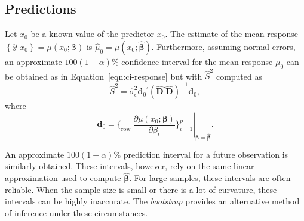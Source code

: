 \documentclass[cmfont,usenames,dvipsnames,leqno]{afit-etd}\usepackage[]{graphicx}\usepackage[]{color}
\newcommand{\trans}{\ensuremath{^\prime}}
\newcommand{\mc}[1]{\ensuremath{\mathcal{#1}}}
\newcommand{\wh}[1]{\ensuremath{\widehat{#1}}}
\begin{document}
\subsection{Predictions}
Let $x_0$ be a known value of the predictor $x_0$. The estimate of the mean response $\left\{\mc{Y} | x_0\right\} = \mu(x_0; \bm{\beta})$ is $\wh{\mu}_0 = \mu(x_0; \wh{\bm{\beta}})$. Furthermore, assuming normal errors, an approximate $100(1 - \alpha)\%$ confidence interval for the mean response $\mu_0$ can be obtained as in Equation~\eqref{eqn:ci-response} but with $\widehat{S}^2$ computed as 
\begin{equation*}
  \widehat{S}^2 = \wh{\sigma}_\epsilon^2 \bm{d}_0\trans\left(\widehat{\bm{D}}\trans\widehat{\bm{D}}\right)^{-1}\bm{d}_0,
\end{equation*}
where
\begin{equation*}
  \bm{d}_0 = \left. \bigg\lbrace_\text{row } \frac{\partial \mu\left(x_0; \bm{\beta}\right)}{\partial\beta_i} \bigg\rbrace_{i = 1}^p \right|_{\bm{\beta} = \wh{\bm{\beta}}}.
\end{equation*}

An approximate $100(1 - \alpha)\%$ prediction interval for a future observation is similarly obtained. These intervals, however, rely on the same linear approximation used to compute $\wh{\bm{\beta}}$. For large samples, these intervals are often reliable. When the sample size is small or there is a lot of curvature, these intervals can be highly inaccurate. The \textit{bootstrap} \citep{efron_bootstrap_1979} provides an alternative method of inference under these circumstances.
\end{document}
